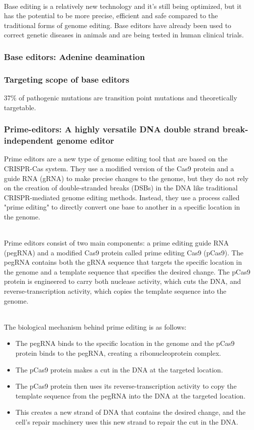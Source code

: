 \begin{itemize}
\begin{itemize}
\\Base editing is a relatively new technology and it's still being optimized, but it has the potential to be more precise, efficient and safe compared to the traditional forms of genome editing. Base editors have already been used to correct genetic diseases in animals and are being tested in human clinical trials.
\subsubsection{Base editors: Adenine deamination}

\subsubsection{Targeting scope of base editors}
37$\%$ of pathogenic mutations are transition point mutations and theoretically targetable.

\subsubsection{Prime-editors: A highly versatile DNA double strand break-independent genome editor}
Prime editors are a new type of genome editing tool that are based on the CRISPR-Cas system. They use a modified version of the Cas9 protein and a guide RNA (gRNA) to make precise changes to the genome, but they do not rely on the creation of double-stranded breaks (DSBs) in the DNA like traditional CRISPR-mediated genome editing methods. Instead, they use a process called "prime editing" to directly convert one base to another in a specific location in the genome.

\\Prime editors consist of two main components: a prime editing guide RNA (pegRNA) and a modified Cas9 protein called prime editing Cas9 (pCas9). The pegRNA contains both the gRNA sequence that targets the specific location in the genome and a template sequence that specifies the desired change. The pCas9 protein is engineered to carry both nuclease activity, which cuts the DNA, and reverse-transcription activity, which copies the template sequence into the genome.

\\The biological mechanism behind prime editing is as follows:

\begin{itemize}
    \item The pegRNA binds to the specific location in the genome and the pCas9 protein binds to the pegRNA, creating a ribonucleoprotein complex.
\item The pCas9 protein makes a cut in the DNA at the targeted location.
\item The pCas9 protein then uses its reverse-transcription activity to copy the template sequence from the pegRNA into the DNA at the targeted location.
\item This creates a new strand of DNA that contains the desired change, and the cell's repair machinery uses this new strand to repair the cut in the DNA.
\end{itemize}




\end{itemize}
\end{itemize}
